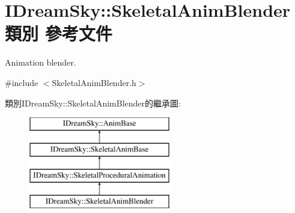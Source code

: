 \hypertarget{class_i_dream_sky_1_1_skeletal_anim_blender}{}\section{I\+Dream\+Sky\+:\+:Skeletal\+Anim\+Blender 類別 參考文件}
\label{class_i_dream_sky_1_1_skeletal_anim_blender}


Animation blender.  




{\ttfamily \#include $<$Skeletal\+Anim\+Blender.\+h$>$}

類別\+I\+Dream\+Sky\+:\+:Skeletal\+Anim\+Blender的繼承圖\+:\begin{figure}[H]
\begin{center}
\leavevmode
\includegraphics[height=4.000000cm]{class_i_dream_sky_1_1_skeletal_anim_blender}
\end{center}
\end{figure}
